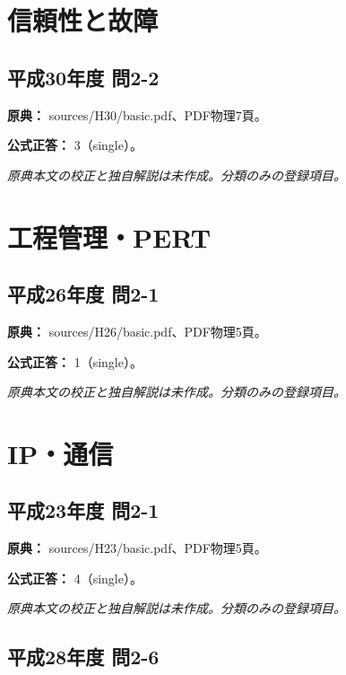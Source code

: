 \section{信頼性と故障}

\subsection{平成30年度 問2-2}
\label{q:h30-reg-basic-2-2}

\noindent\textbf{原典：} sources/H30/basic.pdf、PDF物理7頁。

\textbf{公式正答：} 3（single）。

\par\textit{原典本文の校正と独自解説は未作成。分類のみの登録項目。}

\section{工程管理・PERT}

\subsection{平成26年度 問2-1}
\label{q:h26-reg-basic-2-1}

\noindent\textbf{原典：} sources/H26/basic.pdf、PDF物理5頁。

\textbf{公式正答：} 1（single）。

\par\textit{原典本文の校正と独自解説は未作成。分類のみの登録項目。}

\section{IP・通信}

\subsection{平成23年度 問2-1}
\label{q:h23-reg-basic-2-1}

\noindent\textbf{原典：} sources/H23/basic.pdf、PDF物理5頁。

\textbf{公式正答：} 4（single）。

\par\textit{原典本文の校正と独自解説は未作成。分類のみの登録項目。}

\subsection{平成28年度 問2-6}
\label{q:h28-reg-basic-2-6}

